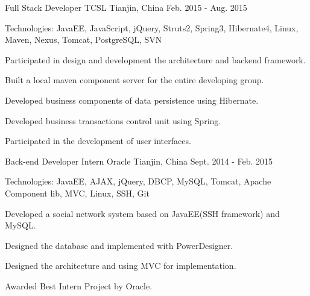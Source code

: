 \begin{cventries}
    
  \cventry
    {Full Stack Developer}
    {TCSL}
    {Tianjin, China}
    {Feb. 2015 - Aug. 2015}
    {
      \begin{cvitems}
        \item {Technologies: JavaEE, JavaScript, jQuery, Struts2, Spring3, Hibernate4, Linux, Maven, Nexus, Tomcat, PostgreSQL, SVN}
        \item {Participated in design and development the architecture and backend framework.}
        \item {Built a local maven component server for the entire developing group.}
        \item {Developed business components of data persistence using Hibernate.}
        \item {Developed business transactions control unit using Spring.}
        \item {Participated in the development of user interfaces.}
      \end{cvitems}
    }
    
  \cventry
    {Back-end Developer Intern}
    {Oracle}
    {Tianjin, China}
    {Sept. 2014 - Feb. 2015}
    {
      \begin{cvitems}
        \item {Technologies: JavaEE, AJAX, jQuery, DBCP, MySQL, Tomcat, Apache Component lib, MVC, Linux, SSH, Git}
        \item {Developed a social network system based on JavaEE(SSH framework) and MySQL.}
        \item {Designed the database and implemented with PowerDesigner.}
        \item {Designed the architecture and using MVC for implementation.}
        \item {Awarded Best Intern Project by Oracle.}
      \end{cvitems} 
    }
\end{cventries}
